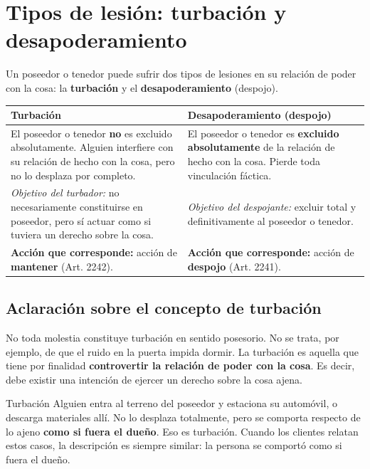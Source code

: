 \documentclass[12pt,oneside]{book}
\begin{document}
\chapter{Tipos de lesión: turbación y desapoderamiento}

Un poseedor o tenedor puede sufrir dos tipos de lesiones en su relación de poder con la cosa: la \textbf{turbación} y el \textbf{desapoderamiento} (despojo).

\begin{table}[H]
\centering
\begin{tabularx}{\textwidth}{
    >{\raggedright\arraybackslash}X
    >{\raggedright\arraybackslash}X
}
\toprule
\textbf{Turbación} & \textbf{Desapoderamiento (despojo)} \\
\midrule
El poseedor o tenedor \textbf{no} es excluido absolutamente. Alguien interfiere con su relación de hecho con la cosa, pero no lo desplaza por completo. &
El poseedor o tenedor es \textbf{excluido absolutamente} de la relación de hecho con la cosa. Pierde toda vinculación fáctica. \\
\addlinespace
\textit{Objetivo del turbador:} no necesariamente constituirse en poseedor, pero sí actuar como si tuviera un derecho sobre la cosa. &
\textit{Objetivo del despojante:} excluir total y definitivamente al poseedor o tenedor. \\
\addlinespace
\textbf{Acción que corresponde:} acción de \textbf{mantener} (Art. 2242). &
\textbf{Acción que corresponde:} acción de \textbf{despojo} (Art. 2241). \\
\bottomrule
\end{tabularx}
\end{table}

\section{Aclaración sobre el concepto de turbación}

No toda molestia constituye turbación en sentido posesorio. No se trata, por ejemplo, de que el ruido en la puerta impida dormir. La turbación es aquella que tiene por finalidad \textbf{controvertir la relación de poder con la cosa}. Es decir, debe existir una intención de ejercer un derecho sobre la cosa ajena.

\begin{example}{Turbación}
Alguien entra al terreno del poseedor y estaciona su automóvil, o descarga materiales allí. No lo desplaza totalmente, pero se comporta respecto de lo ajeno \textbf{como si fuera el dueño}. Eso es turbación. Cuando los clientes relatan estos casos, la descripción es siempre similar: la persona se comportó como si fuera el dueño.
\end{example}
\end{document}
